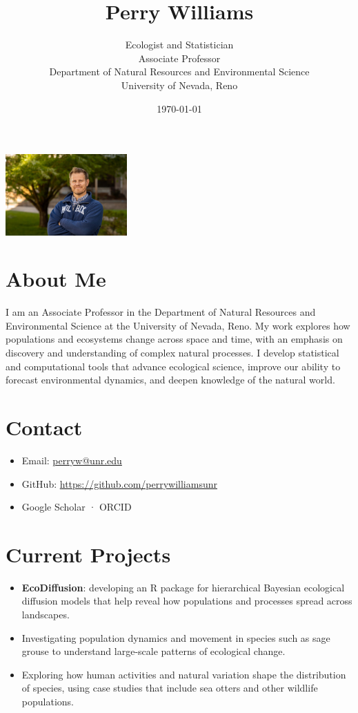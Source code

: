 \title{Perry Williams}
\author{Ecologist and Statistician \\ Associate Professor \\ Department of Natural Resources and Environmental Science \\ University of Nevada, Reno}
\date{\today}


\maketitle

\begin{center}
  \includegraphics[width=0.35\textwidth]{assets/perry_2024.jpg}
\end{center}

\section*{About Me}
I am an Associate Professor in the Department of Natural Resources and Environmental Science at the University of Nevada, Reno.  
My work explores how populations and ecosystems change across space and time, with an emphasis on discovery and understanding of complex natural processes.  
I develop statistical and computational tools that advance ecological science, improve our ability to forecast environmental dynamics, and deepen knowledge of the natural world.


\section*{Contact}
\begin{itemize}
  \item Email: \href{mailto:perryw@unr.edu}{perryw@unr.edu}
  \item GitHub: \url{https://github.com/perrywilliamsunr}
  \item Google Scholar · ORCID
\end{itemize}

\section*{Current Projects}
\begin{itemize}
  \item \textbf{EcoDiffusion}: developing an R package for hierarchical Bayesian ecological diffusion models that help reveal how populations and processes spread across landscapes.
  \item Investigating population dynamics and movement in species such as sage grouse to understand large-scale patterns of ecological change.
  \item Exploring how human activities and natural variation shape the distribution of species, using case studies that include sea otters and other wildlife populations.
\end{itemize}

